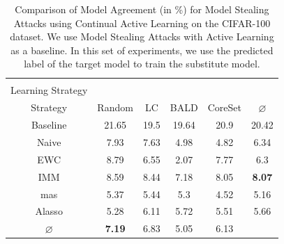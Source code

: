 \begin{table}[h]
    \centering
    \begin{tabular}{c | c c c c | c} 
        \hline
        \diagbox[width=11em]{Active \\ Learning Strategy}{Continual Learning \\ Strategy} & Random & LC & BALD & CoreSet & $\varnothing$\\ 
        \hline 
        Baseline & 21.65 & 19.5 & 19.64 & 20.9 & 20.42\\
        \hline
        Naive & 7.93 & 7.63 & 4.98 & 4.82 & 6.34\\
        EWC & 8.79 & 6.55 & 2.07 & 7.77 & 6.3\\
        IMM & 8.59 & 8.44 & 7.18 & 8.05 & \textbf{8.07}\\
        \gls{mas} & 5.37 & 5.44 & 5.3 & 4.52 & 5.16\\
        Alasso & 5.28 & 6.11 & 5.72 & 5.51 & 5.66\\
        \hline
        $\varnothing$ & \textbf{7.19} & 6.83 & 5.05 & 6.13 \\
        \hline
    \end{tabular}
    \caption{Comparison of Model Agreement (in \%) for Model Stealing Attacks using Continual Active Learning on the CIFAR-100 dataset.
    We use Model Stealing Attacks with Active Learning as a baseline. In this set of experiments,
    we use the predicted label of the target model to train the substitute model.}
    \label{fig:ModelStealingCIFAR100Label}
\end{table}


